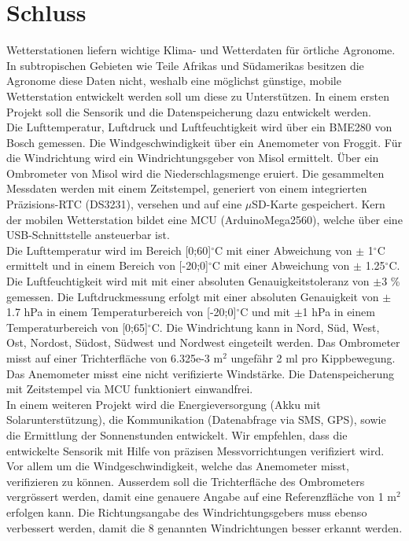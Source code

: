 \section{Schluss}

Wetterstationen liefern wichtige Klima- und Wetterdaten für örtliche Agronome. In subtropischen Gebieten wie Teile Afrikas und Südamerikas besitzen die Agronome diese Daten nicht, weshalb eine möglichst günstige, mobile Wetterstation entwickelt werden soll um diese zu Unterstützen. In einem ersten Projekt soll die Sensorik und die Datenspeicherung dazu entwickelt werden.\\[0.5cm]
Die Lufttemperatur, Luftdruck und Luftfeuchtigkeit wird über ein BME280 von Bosch gemessen. Die Windgeschwindigkeit über ein Anemometer von Froggit. Für die Windrichtung wird ein Windrichtungsgeber von Misol ermittelt. Über ein Ombrometer von Misol wird die Niederschlagsmenge eruiert. Die gesammelten Messdaten werden mit einem Zeitstempel, generiert von einem integrierten Präzisions-RTC (DS3231), versehen und auf eine $\mu$SD-Karte gespeichert. Kern der mobilen Wetterstation bildet eine MCU (ArduinoMega2560), welche über eine USB-Schnittstelle ansteuerbar ist.\\[0.5cm]
Die Lufttemperatur wird im Bereich [0;60]$^\circ$C mit einer Abweichung von $\pm$ 1$^\circ$C ermittelt und in einem Bereich von [-20;0]$^\circ$C mit einer Abweichung von $\pm$ 1.25$^\circ$C. Die Luftfeuchtigkeit wird mit mit einer absoluten Genauigkeitstoleranz von $\pm$3 \% gemessen. Die Luftdruckmessung erfolgt mit einer absoluten Genauigkeit von $\pm$1.7 hPa in einem Temperaturbereich von [-20;0]$^\circ$C und mit $\pm$1 hPa in einem Temperaturbereich von [0;65]$^\circ$C. Die Windrichtung kann in Nord, Süd, West, Ost, Nordost, Südost, Südwest und Nordwest eingeteilt werden. Das Ombrometer misst auf einer Trichterfläche von 6.325e-3 m$^2$ ungefähr 2 ml pro Kippbewegung. Das Anemometer misst eine nicht verifizierte Windstärke. Die Datenspeicherung mit Zeitstempel via MCU funktioniert einwandfrei.\\[0.5cm]
In einem weiteren Projekt wird die Energieversorgung (Akku mit Solarunterstützung), die Kommunikation (Datenabfrage via SMS, GPS), sowie die Ermittlung der Sonnenstunden entwickelt. Wir empfehlen, dass die entwickelte Sensorik mit Hilfe von präzisen Messvorrichtungen verifiziert wird. Vor allem um die Windgeschwindigkeit, welche das Anemometer misst, verifizieren zu können. Ausserdem soll die Trichterfläche des Ombrometers vergrössert werden, damit eine genauere Angabe auf eine Referenzfläche von 1 m$^2$ erfolgen kann. Die Richtungsangabe des Windrichtungsgebers muss ebenso verbessert werden, damit die 8 genannten Windrichtungen besser erkannt werden.\\